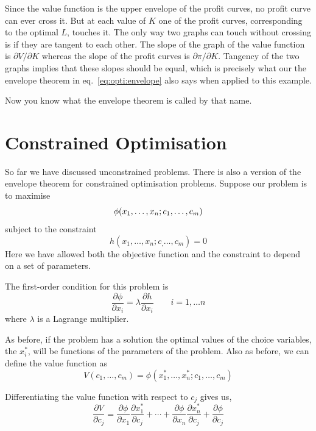 \documentclass[12pt,reqno,openany]{amsbook}
\theoremstyle{plain}
\theoremstyle{definition}
\begin{document}
Since the value function is the upper envelope of the profit curves,
no profit curve can ever cross it. But at each value of $K$ one of the
profit curves, corresponding to the optimal $L$, touches it. The only
way two graphs can touch without crossing is if they are tangent to
each other. The slope of the graph of the value function is $\partial
V/\partial K$ whereas the slope of the profit curves is $\partial
\pi/\partial K$. Tangency of the two graphs implies that these slopes
should be equal, which is precisely what our the envelope theorem in
eq.~\eqref{eq:opti:envelope} also says when applied to this example.

Now you know what the envelope theorem is called by that name.

\section{Constrained Optimisation}
So far we have discussed unconstrained problems. There is also a
version of the envelope theorem for constrained optimisation problems.
Suppose our problem is to maximise
\begin{equation*}
\phi(x_1,\ldots,x_n;c_1,\ldots,c_m)\\
\end{equation*}
subject to the constraint
\begin{equation}\label{eq:opti:constraint}
h(x_1,\ldots,x_n;c_,\ldots,c_m)=0
\end{equation}
Here we have allowed both the objective function and the constraint to
depend on a set of parameters.

The first-order condition for this problem is
\begin{equation}\label{eq:opti:cfoc}
\frac{\partial \phi}{\partial x_i}
=\lambda \frac{\partial h}{\partial  x_i}
\qquad i=1,\ldots n
\end{equation}
where $\lambda$ is a Lagrange multiplier.

As before, if the problem has a solution the optimal values of the
choice variables, the $x_i^*$, will be functions of the parameters of
the problem. Also as before, we can define the value function as
\[V(c_1,\ldots,c_m)=\phi(x_1^*,\ldots,x_n^*;c_1,\ldots,c_m)\]

Differentiating the value function with respect to $c_j$ gives us,
\begin{equation}\label{eq:opti:value-chain}
\frac{\partial V}{\partial c_j}=
\frac{\partial \phi}{\partial x_1}\frac{\partial x^*_1}{\partial c_j}
+\cdots
+\frac{\partial \phi}{\partial x_n}\frac{\partial x^*_n}{\partial c_j}
+\frac{\partial \phi}{\partial c_j}
\end{equation}
\end{document}
